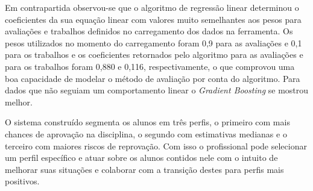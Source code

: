 Em contrapartida observou-se que o algoritmo de regressão linear determinou o coeficientes da sua equação linear com valores muito semelhantes aos pesos para avaliações e trabalhos definidos no carregamento dos dados na ferramenta.
Os pesos utilizados no momento do carregamento foram 0,9 para as avaliações e 0,1 para os trabalhos e os coeficientes retornados pelo algoritmo para as avaliações e para os trabalhos foram 0,880 e 0,116, respectivamente, o que comprovou uma boa capacidade de modelar o método de avaliação por conta do algoritmo.
Para dados que não seguiam um comportamento linear o \textit{Gradient Boosting} se mostrou melhor.

O sistema construído segmenta os alunos em três perfis, o primeiro com mais chances de aprovação na disciplina, o segundo com estimativas medianas e o terceiro com maiores riscos de reprovação. 
Com isso o profissional pode selecionar um perfil específico e atuar sobre os alunos contidos nele com o intuito de melhorar suas situações e colaborar com a transição destes para perfis mais positivos.